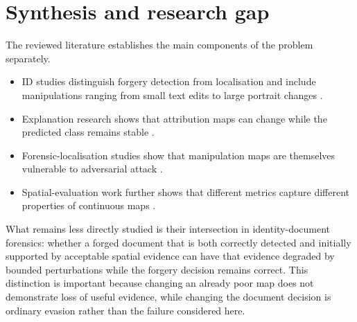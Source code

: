 

\section{Synthesis and research gap}
\label{sec:lr-gap}

The reviewed literature establishes the main components of the problem separately. 
\begin{itemize}
    \item ID studies distinguish forgery detection from localisation and include manipulations ranging from small text edits to large portrait changes \citep{korshunov2025fantasyid,korshunov2025deepid}.
    \item Explanation research shows that attribution maps can change while the predicted class remains stable \citep{ghorbani2019fragile,dombrowski2019explanations}.
    \item Forensic-localisation studies show that manipulation maps are themselves vulnerable to adversarial attack \citep{cao2024transferable,shao2024documentrobustness}.
    \item Spatial-evaluation work further shows that different metrics capture different properties of continuous maps \citep{wang2020scorecam,arras2022clevrxai}.
\end{itemize}

What remains less directly studied is their intersection in identity-document forensics: whether a forged document that is both correctly detected and initially supported by acceptable spatial evidence can have that evidence degraded by bounded perturbations while the forgery decision remains correct. This distinction is important because changing an already poor map does not demonstrate loss of useful evidence, while changing the document decision is ordinary evasion rather than the failure considered here.

